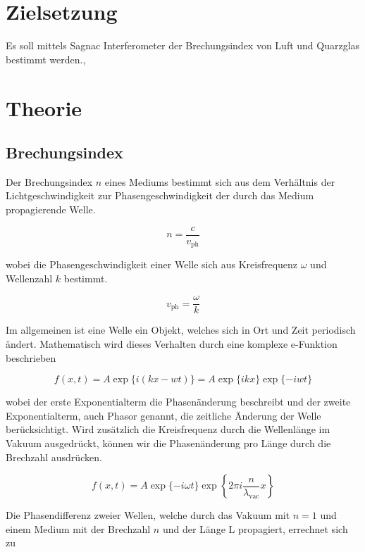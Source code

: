 \section{Zielsetzung}
Es soll mittels Sagnac Interferometer der Brechungsindex von Luft und Quarzglas bestimmt werden.,

\section{Theorie}
\subsection{Brechungsindex}
Der Brechungsindex $n$ eines Mediums bestimmt sich aus dem Verhältnis der Lichtgeschwindigkeit zur Phasengeschwindigkeit der durch das Medium
propagierende Welle.

\begin{equation}
n = \frac{c}{v_\text{ph}}
\end{equation}

wobei die Phasengeschwindigkeit einer Welle sich aus Kreisfrequenz $\omega$ und Wellenzahl $k$ bestimmt.

\begin{equation}
v_\text{ph} = \frac{\omega}{k}
\end{equation}

Im allgemeinen ist eine Welle ein Objekt, welches sich in Ort und Zeit periodisch ändert. Mathematisch wird dieses Verhalten durch eine komplexe
e-Funktion beschrieben

\begin{equation}
f(x, t) = A\exp\{i(kx - wt)\} = A \exp\{ikx\} \exp\{-iwt\}
\end{equation}

wobei der erste Exponentialterm die Phasenänderung beschreibt und der zweite Exponentialterm, auch Phasor genannt, die zeitliche Änderung der Welle berücksichtigt.
Wird zusätzlich die Kreisfrequenz durch die Wellenlänge im Vakuum ausgedrückt, können wir die Phasenänderung pro Länge durch die Brechzahl ausdrücken.

\begin{equation}
f(x, t) = A \exp\{-i\omega t\} \exp\left\{2 \pi i \frac{n}{\lambda_\text{vac}} x\right\}
\end{equation}

Die Phasendifferenz zweier Wellen, welche durch das Vakuum mit $n=1$ und einem Medium mit der Brechzahl $n$ und der Länge L propagiert, errechnet sich zu

